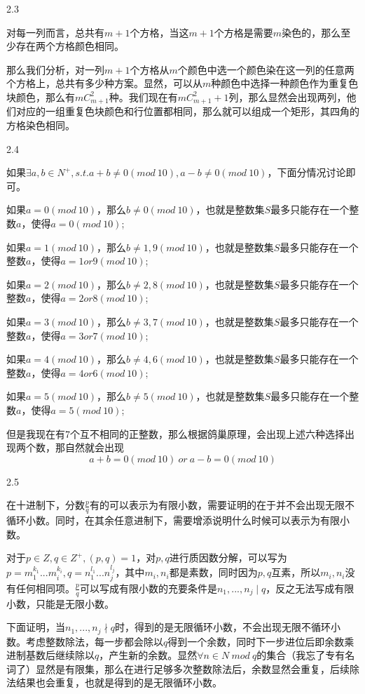 \documentclass[a4paper]{article}
\begin{document}
\begin{enumerate}
2.3

\begin{solution}

对每一列而言，总共有$m+1$个方格，当这$m+1$个方格是需要$m$染色的，那么至少存在两个方格颜色相同。

那么我们分析，对一列$m+1$个方格从$m$个颜色中选一个颜色染在这一列的任意两个方格上，总共有多少种方案。显然，可以从$m$种颜色中选择一种颜色作为重复色块颜色，那么有$m C_{m+1}^{2}$种。我们现在有$mC_{m+1}^2+1$列，那么显然会出现两列，他们对应的一组重复色块颜色和行位置都相同，那么就可以组成一个矩形，其四角的方格染色相同。

\end{solution}


2.4
\begin{solution}

如果$\exists a,b \in N^+,s.t. a+b\neq 0 (mod\ 10), a - b \neq 0(mod\ 10)$，下面分情况讨论即可。

如果$a=0(mod\ 10)$，那么$b\neq 0(mod\ 10)$，也就是整数集$S$最多只能存在一个整数$a$，使得$a=0(mod\ 10)$;

如果$a=1(mod\ 10)$，那么$b\neq 1,9(mod\ 10)$，也就是整数集$S$最多只能存在一个整数$a$，使得$a= 1 or 9(mod\ 10)$;

如果$a=2(mod\ 10)$，那么$b\neq 2,8(mod\ 10)$，也就是整数集$S$最多只能存在一个整数$a$，使得$a=2 or 8(mod\ 10)$;

如果$a=3(mod\ 10)$，那么$b\neq 3,7(mod\ 10)$，也就是整数集$S$最多只能存在一个整数$a$，使得$a=3 or 7(mod\ 10)$;

如果$a=4(mod\ 10)$，那么$b\neq 4,6(mod\ 10)$，也就是整数集$S$最多只能存在一个整数$a$，使得$a=4 or 6(mod\ 10)$;

如果$a=5(mod\ 10)$，那么$b\neq 5(mod\ 10)$，也就是整数集$S$最多只能存在一个整数$a$，使得$a=5(mod\ 10)$;

但是我现在有7个互不相同的正整数，那么根据鸽巢原理，会出现上述六种选择出现两个数，那自然就会出现$$a+b = 0 (mod\ 10)\ or\ a-b= 0 (mod\ 10)$$

\end{solution}


2.5

\begin{solution}

在十进制下，分数$\frac{p}{q}$有的可以表示为有限小数，需要证明的在于并不会出现无限不循环小数。同时，在其余任意进制下，需要增添说明什么时候可以表示为有限小数。

对于$p\in Z, q\in Z^+,(p,q)=1$，对$p,q$进行质因数分解，可以写为$p = m_1^{k_1}...m_i^{k_i}, q = n_1^{l_1}...n_j^{l_j}$，其中$m_i, n_i$都是素数，同时因为$p,q$互素，所以$m_i, n_i$没有任何相同项。$\frac{p}{q}$可以写成有限小数的充要条件是$n_1,...,n_j \mid q$，反之无法写成有限小数，只能是无限小数。

下面证明，当$n_1,...,n_j \nmid q$时，得到的是无限循环小数，不会出现无限不循环小数。考虑整数除法，每一步都会除以$q$得到一个余数，同时下一步进位后即余数乘进制基数后继续除以$q$，产生新的余数。显然$\forall n\in N\ mod\ q$的集合（我忘了专有名词了）显然是有限集，那么在进行足够多次整数除法后，余数显然会重复，后续除法结果也会重复，也就是得到的是无限循环小数。

\end{solution}

\end{enumerate}
\end{document}
